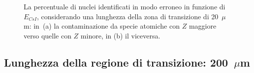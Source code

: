 \begin{figure}[!p] 
	\centering
	\hspace{10mm}
	\caption{La percentuale di nuclei identificati in modo erroneo in funzione di $E_{CsI}$, considerando una lunghezza della zona di transizione di 20~$\mu$m: in~(a) la contaminazione da specie atomiche con $Z$ maggiore verso quelle con $Z$ minore, in (b) il viceversa.} \label{fig:leakage_res_20um}
\end{figure}


\subsection*{Lunghezza della regione di transizione: 200~$\mu$m}

